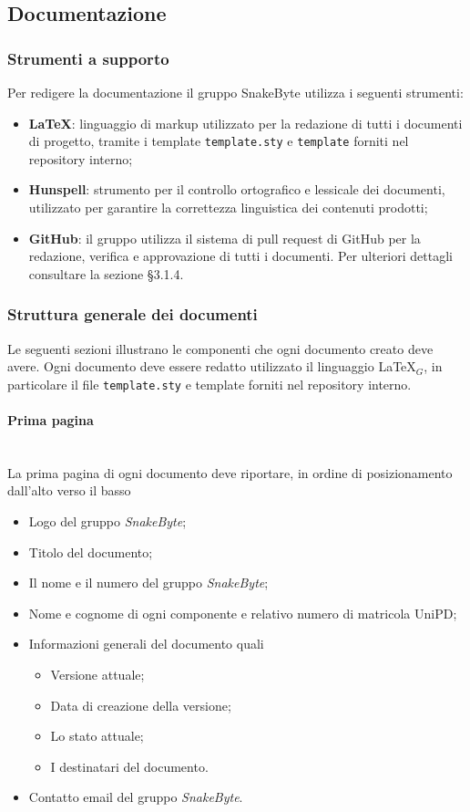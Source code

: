 \documentclass[10pt, letterpaper]{article}
\newcommand{\trisubsection}[1]{\paragraph{#1}\mbox{}\\}
\begin{document}
\subsection{Documentazione}

\subsubsection{Strumenti a supporto}
Per redigere la documentazione il gruppo SnakeByte utilizza i seguenti strumenti:
\begin{itemize}
    \item \textbf{\LaTeX}: linguaggio di markup utilizzato per la redazione 
    di tutti i documenti di progetto, tramite i template \texttt{template.sty} 
    e \texttt{template} forniti nel repository interno;
    \item \textbf{Hunspell}: strumento per il controllo ortografico e lessicale 
    dei documenti, utilizzato per garantire la correttezza linguistica dei 
    contenuti prodotti;
    \item \textbf{GitHub}: il gruppo utilizza il sistema di pull request di 
    GitHub per la redazione, verifica e approvazione di tutti i documenti. 
    Per ulteriori dettagli consultare la sezione §3.1.4.
\end{itemize}

\subsubsection{Struttura generale dei documenti}
\label{sec:Struttura}
Le seguenti sezioni illustrano le componenti che ogni documento creato deve avere. Ogni documento deve essere redatto utilizzato il linguaggio \LaTeX$_{G}$, in particolare il file \texttt{template.sty} e template forniti nel repository interno.

\trisubsection{Prima pagina}
La prima pagina di ogni documento deve riportare, in ordine di posizionamento dall'alto verso il basso

\begin{itemize}
    \item Logo del gruppo \textit{SnakeByte};
    \item Titolo del documento;
    \item Il nome e il numero del gruppo \textit{SnakeByte};
    \item Nome e cognome di ogni componente e relativo numero di matricola UniPD;
    \item Informazioni generali del documento quali
          \begin{itemize}
              \item Versione attuale;
              \item Data di creazione della versione;
              \item Lo stato attuale;
              \item I destinatari del documento.
          \end{itemize}
    \item Contatto email del gruppo \textit{SnakeByte}.
\end{itemize}
\end{document}
